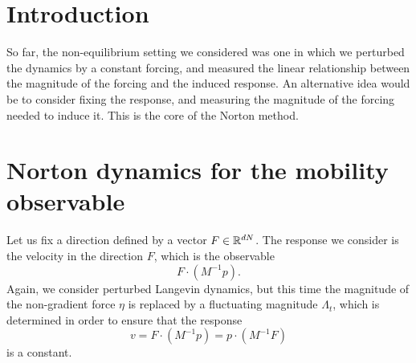 \section{Introduction}
So far, the non-equilibrium setting we considered was one in which we perturbed the dynamics by a constant forcing,
 and measured the linear relationship between the magnitude of the forcing and the induced response.
An alternative idea would be to consider fixing the response, and measuring the magnitude of the forcing needed to induce it. This is the core of the Norton method.


\section{Norton dynamics for the mobility observable}
Let us fix a direction defined by a vector $F\in \mathbb{R}^{dN}$. The response we consider is the velocity in the direction $F$, which is the observable \[F\cdot \left(M^{-1} p\right).\]
Again, we consider perturbed Langevin dynamics, but this time the magnitude of the non-gradient force $\eta$ is replaced by a fluctuating magnitude $\Lambda_t$, which is determined in order to ensure that the response
\[v=F\cdot\left(M^{-1}p\right)=p\cdot\left(M^{-1}F\right)\]
is a constant.

